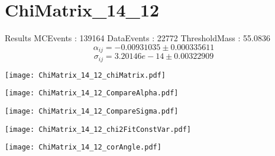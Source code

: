 \documentclass[a4paper,12pt]{article}
\begin{document}
\section{ChiMatrix\_14\_12}
\begin{minipage}{0.49\linewidth} Results \newline
MCEvents : 139164\newline
DataEvents : 22772 \newline
ThresholdMass : 55.0836\\
$$\alpha_{ij} = -0.00931035\pm 0.000335611$$
$$\sigma_{ij} = 3.20146e-14\pm 0.00322909$$
\end{minipage}\hfill
\begin{minipage}{0.49\linewidth} 
\texttt{[image: ChiMatrix\_14\_12\_chiMatrix.pdf]}\\
\end{minipage}
\hfill
\begin{minipage}{0.49\linewidth} 
\texttt{[image: ChiMatrix\_14\_12\_CompareAlpha.pdf]}\\
\end{minipage}
\hfill
\begin{minipage}{0.49\linewidth} 
\texttt{[image: ChiMatrix\_14\_12\_CompareSigma.pdf]}\\
\end{minipage}
\begin{minipage}{0.49\linewidth} 
\texttt{[image: ChiMatrix\_14\_12\_chi2FitConstVar.pdf]}\\
\end{minipage}
\hfill
\begin{minipage}{0.49\linewidth} 
\texttt{[image: ChiMatrix\_14\_12\_corAngle.pdf]}\\
\end{minipage}
\end{document}
